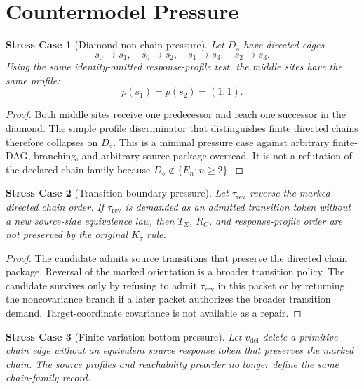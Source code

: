 \documentclass[11pt]{article}
\newcommand{\Ddiamond}{D_{\diamond}}
\newtheorem{stresscase}{Stress Case}
\begin{document}
\section{Countermodel Pressure}

\begin{stresscase}[Diamond non-chain pressure]
Let \(\Ddiamond\) have directed edges
\[
  s_0\to s_1,\quad s_0\to s_2,\quad s_1\to s_3,\quad s_2\to s_3.
\]
Using the same identity-omitted response-profile test, the middle sites have
the same profile:
\[
  p(s_1)=p(s_2)=(1,1).
\]
\end{stresscase}

\begin{proof}
Both middle sites receive one predecessor and reach one successor in the
diamond. The simple profile discriminator that distinguishes finite directed
chains therefore collapses on \(\Ddiamond\). This is a minimal pressure case
against arbitrary finite-DAG, branching, and arbitrary source-package overread.
It is not a refutation of the declared chain family because
\(\Ddiamond\notin\{E_n:n\ge 2\}\).
\end{proof}

\begin{stresscase}[Transition-boundary pressure]
Let \(\tau_{\mathrm{rev}}\) reverse the marked directed chain order. If
\(\tau_{\mathrm{rev}}\) is demanded as an admitted transition token without a
new source-side equivalence law, then \(T_{\Sigma}\), \(R_C\), and
response-profile order are not preserved by the original \(K_{\tau}\) rule.
\end{stresscase}

\begin{proof}
The candidate admits source transitions that preserve the directed chain
package. Reversal of the marked orientation is a broader transition policy.
The candidate survives only by refusing to admit \(\tau_{\mathrm{rev}}\) in
this packet or by returning the noncovariance branch if a later packet
authorizes the broader transition demand. Target-coordinate covariance is not
available as a repair.
\end{proof}

\begin{stresscase}[Finite-variation bottom pressure]
Let \(v_{\mathrm{del}}\) delete a primitive chain edge without an equivalent
source response token that preserves the marked chain. The source profiles
and reachability preorder no longer define the same chain-family record.
\end{stresscase}
\end{document}
